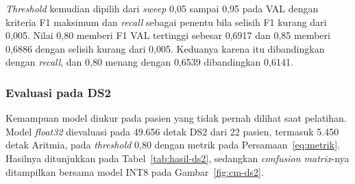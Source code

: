 \textit{Threshold} kemudian dipilih dari \textit{sweep} 0,05 sampai 0,95 pada VAL dengan kriteria F1 maksimum dan \textit{recall} sebagai penentu bila selisih F1 kurang dari 0,005. Nilai 0,80 memberi F1 VAL tertinggi sebesar 0,6917 dan 0,85 memberi 0,6886 dengan selisih kurang dari 0,005. Keduanya karena itu dibandingkan dengan \textit{recall}, dan 0,80 menang dengan 0,6539 dibandingkan 0,6141.

\subsubsection{Evaluasi pada DS2}

Kemampuan model diukur pada pasien yang tidak pernah dilihat saat pelatihan. Model \textit{float32} dievaluasi pada 49.656 detak DS2 dari 22 pasien, termasuk 5.450 detak Aritmia, pada \textit{threshold} 0,80 dengan metrik pada Persamaan~\ref{eq:metrik}. Hasilnya ditunjukkan pada Tabel~\ref{tab:hasil-ds2}, sedangkan \textit{confusion matrix}-nya ditampilkan bersama model INT8 pada Gambar~\ref{fig:cm-ds2}.

